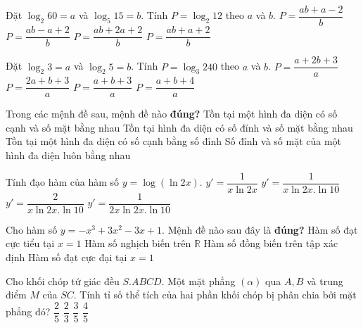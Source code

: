 \begin{ex}%
	Đặt $\log_2 60=a$ và $\log_5 15=b$. Tính $P=\log_2 12$ theo $a$ và $b$. 
	\choice
	{$P=\dfrac{ab+a-2}{b}$}
	{\True $P=\dfrac{ab-a+2}{b}$}
	{$P=\dfrac{ab+2a+2}{b}$}
	{$P=\dfrac{ab+a+2}{b}$}
\end{ex}

\begin{ex}%
	Đặt $\log_2 3=a$ và $\log_2 5=b$. Tính $P=\log_3 240$ theo $a$ và $b$. 
	\choice
	{$P=\dfrac{a+2b+3}{a}$}
	{$P=\dfrac{2a+b+3}{a}$}
	{$P=\dfrac{a+b+3}{a}$}
	{\True $P=\dfrac{a+b+4}{a}$}
\end{ex}

\begin{ex}%
	Trong các mệnh đề sau, mệnh đề nào \textbf{đúng?}
	\choice
	{Tồn tại một hình đa diện có số cạnh và số mặt bằng nhau}
	{\True Tồn tại hình đa diện có số đỉnh và số mặt bằng nhau}
	{Tồn tại một hình đa diện có số cạnh bằng số đỉnh}
	{Số đỉnh và số mặt của một hình đa diện luôn bằng nhau}
\end{ex}

\begin{ex}%
	Tính đạo hàm của hàm số $y=\log(\ln 2x)$.
	\choice
	{$y'=\dfrac{1}{x\ln 2x}$}
	{\True $y'=\dfrac{1}{x\ln 2x.\ln 10}$}
	{$y'=\dfrac{2}{x\ln 2x.\ln 10}$}
	{$y'=\dfrac{1}{2x\ln 2x.\ln 10}$}
\end{ex}

\begin{ex}%
	Cho hàm số $ y=-x^3+3x^2-3x+1$. Mệnh đề nào sau đây là \textbf{đúng?}
	\choice
	{Hàm số đạt cực tiểu tại $x=1$}
	{\True Hàm số nghịch biến trên $\mathbb{R}$}
	{Hàm số đồng biến trên tập xác định}
	{Hàm số đạt cực đại tại $x=1$}
\end{ex}

\begin{ex}%
	Cho khối chóp tứ giác đều $S.ABCD$. Một mặt phẳng $(\alpha)$ qua $A,B$ và trung điểm $M$ của $SC$. Tính tỉ số thể tích của hai phần khối chóp bị phân chia bởi mặt phẳng đó?
	\choice
	{$\dfrac{2}{5}$}
	{$\dfrac{2}{3}$}
	{\True $\dfrac{3}{5}$}
	{$\dfrac{4}{5}$}
\end{ex}

